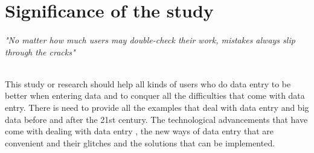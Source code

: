 \documentclass[12pt,]{article}
\begin{document}
\section{
\textbf{Significance of the study}}
\paragraph*{}
\begin{center}
\textit{"No matter how much users may double-check their work, mistakes always slip through the cracks"}
\end{center}
\\
This study or research should help all kinds of users who do data entry to be better when entering data and to conquer all the difficulties that come with data entry. There is need to provide all the examples that deal with data entry and big data  before and after the 21st century. The technological advancements that have come with dealing with data entry , the new ways of data entry that are convenient and their glitches and the solutions that can be implemented.
\end{document}
